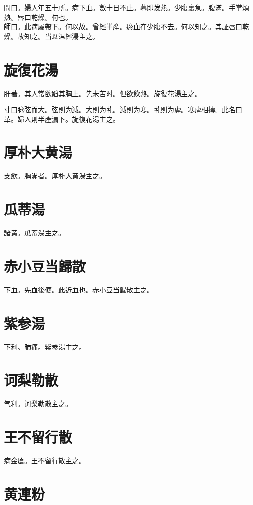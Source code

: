 \documentclass[12pt,twoside,UTF8,b5paper]{ctexbook}
\begin{document}
問曰。婦人年五十所。病下血。數十日不止。暮即发熱。少腹裏急。腹滿。手掌煩熱。唇口乾燥。何也。\\
師曰。此病屬帶下。何以故。曾經半產。瘀血在少腹不去。何以知之。其証唇口乾燥。故知之。当以温經湯主之。

\section{旋復花湯}

肝著。其人常欲蹈其胸上。先未苦时。但欲飲熱。旋復花湯主之。

寸口脉弦而大。弦則为減。大則为芤。減則为寒。芤則为虗。寒虗相摶。此名曰革。婦人則半產漏下。旋復花湯主之。

\section{厚朴大黄湯}

支飲。胸滿者。厚朴大黄湯主之。

\section{瓜蒂湯}

諸黄。瓜蒂湯主之。

\section{赤小豆当歸散}

下血。先血後便。此近血也。赤小豆当歸散主之。

\section{紫参湯}

下利。肺痛。紫参湯主之。

\section{诃梨勒散}

气利。诃梨勒散主之。

\section{王不留行散}

病金瘡。王不留行散主之。

\section{黄連粉}
\end{document}
